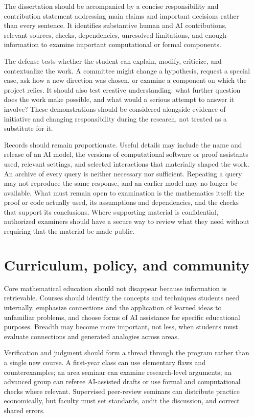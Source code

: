 \documentclass[11pt]{article}
\begin{document}
The dissertation should be accompanied by a concise responsibility and contribution
statement addressing main claims and important decisions rather than every sentence.
It identifies substantive human and AI contributions, relevant sources, checks,
dependencies, unresolved limitations, and enough information to examine important
computational or formal components.

The defense tests whether the student can explain, modify, criticize, and contextualize
the work. A committee might change a hypothesis, request a special case, ask how a new
direction was chosen, or examine a component on which the project relies. It should
also test creative understanding: what further question does the work make possible,
and what would a serious attempt to answer it involve? These demonstrations should be
considered alongside evidence of initiative and changing responsibility during the
research, not treated as a substitute for it.

Records should remain proportionate. Useful details may include the name and release
of an AI model, the versions of computational software or proof assistants used, relevant
settings, and selected interactions that materially shaped the work. An archive of
every query is neither necessary nor sufficient. Repeating a query may not reproduce
the same response, and an earlier model may no longer be available. What must remain
open to examination is the mathematics itself: the proof or code actually used, its
assumptions and dependencies, and the checks that support its conclusions. Where
supporting material is confidential, authorized examiners should have a secure way to
review what they need without requiring that the material be made public.

\section{Curriculum, policy, and community}

Core mathematical education should not disappear because information is retrievable.
Courses should identify the concepts and techniques students need internally, emphasize
connections and the application of learned ideas to unfamiliar problems, and choose
forms of AI assistance for specific educational purposes.  Breadth may become more important, not less, when students must evaluate
connections and generated analogies across areas.

Verification and judgment should form a thread through the program rather than a single
new course.  A first-year class can use elementary flaws and counterexamples; an area
seminar can examine research-level arguments; an advanced group can referee AI-assisted
drafts or use formal and computational checks where relevant.  Supervised peer-review
seminars can distribute practice economically, but faculty must set standards, audit the
discussion, and correct shared errors.
\end{document}
